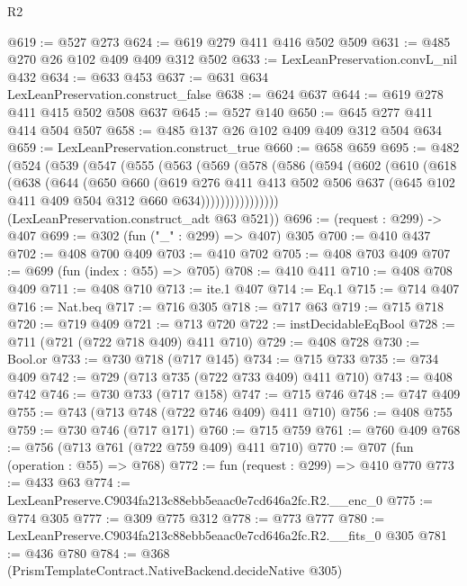 \begin{lexlean}{R2}
\begin{coremodule}
@619 := @527 @273
@624 := @619 @279 @411 @416 @502 @509
@631 := @485 @270 @26 @102 @409 @409 @312 @502
@633 := LexLeanPreservation.convL_nil @432
@634 := @633 @453
@637 := @631 @634 LexLeanPreservation.construct_false
@638 := @624 @637
@644 := @619 @278 @411 @415 @502 @508 @637
@645 := @527 @140
@650 := @645 @277 @411 @414 @504 @507
@658 := @485 @137 @26 @102 @409 @409 @312 @504 @634
@659 := LexLeanPreservation.construct_true
@660 := @658 @659
@695 := @482
    (@524
      (@539
        (@547
          (@555
            (@563
              (@569
                (@578
                  (@586
                    (@594
                      (@602
                        (@610
                          (@618
                            (@638
                              (@644
                                (@650
                                  @660
                                  (@619
                                    @276
                                    @411
                                    @413
                                    @502
                                    @506
                                    @637
                                    (@645 @102 @411 @409 @504 @312 @660 @634))))))))))))))))
      (LexLeanPreservation.construct_adt @63 @521))
@696 := (request : @299) -> @407
@699 := @302 (fun ("_" : @299) => @407) @305
@700 := @410 @437
@702 := @408 @700 @409
@703 := @410 @702
@705 := @408 @703 @409
@707 := @699 (fun (index : @55) => @705)
@708 := @410 @411
@710 := @408 @708 @409
@711 := @408 @710
@713 := ite.{1} @407
@714 := Eq.{1}
@715 := @714 @407
@716 := Nat.beq
@717 := @716 @305
@718 := @717 @63
@719 := @715 @718
@720 := @719 @409
@721 := @713 @720
@722 := instDecidableEqBool
@728 := @711 (@721 (@722 @718 @409) @411 @710)
@729 := @408 @728
@730 := Bool.or
@733 := @730 @718 (@717 @145)
@734 := @715 @733
@735 := @734 @409
@742 := @729 (@713 @735 (@722 @733 @409) @411 @710)
@743 := @408 @742
@746 := @730 @733 (@717 @158)
@747 := @715 @746
@748 := @747 @409
@755 := @743 (@713 @748 (@722 @746 @409) @411 @710)
@756 := @408 @755
@759 := @730 @746 (@717 @171)
@760 := @715 @759
@761 := @760 @409
@768 := @756 (@713 @761 (@722 @759 @409) @411 @710)
@770 := @707 (fun (operation : @55) => @768)
@772 := fun (request : @299) => @410 @770
@773 := @433 @63
@774 := LexLeanPreserve.C9034fa213c88ebb5eaac0e7cd646a2fc.R2.__enc_0
@775 := @774 @305
@777 := @309 @775 @312
@778 := @773 @777
@780 := LexLeanPreserve.C9034fa213c88ebb5eaac0e7cd646a2fc.R2.__fits_0 @305
@781 := @436 @780
@784 := @368 (PrismTemplateContract.NativeBackend.decideNative @305)

\end{coremodule}
\end{lexlean}
